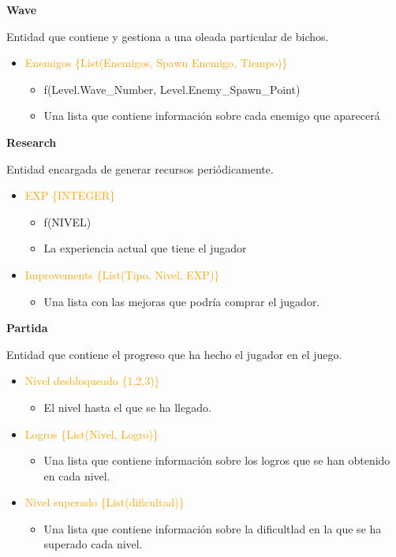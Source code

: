 \documentclass{article}
\begin{document}
\noindent \textbf{Wave}

\hfill \break \noindent Entidad que contiene y gestiona a una oleada particular de bichos.

\begin{itemize}
    \item \textcolor{Orange}{Enemigos \{List(Enemigos, Spawn Enemigo, Tiempo)\}}
    \begin{itemize}
        \item f(Level.Wave\_Number, Level.Enemy\_Spawn\_Point)
        \item Una lista que contiene información sobre cada enemigo que aparecerá
    \end{itemize}
\end{itemize}

\noindent \textbf{Research}

\hfill \break \noindent Entidad encargada de generar recursos periódicamente.

\begin{itemize}
    \item \textcolor{Orange}{EXP \{INTEGER\}}
    \begin{itemize}
        \item f(NIVEL)
        \item La experiencia actual que tiene el jugador
    \end{itemize}
    \item \textcolor{Orange}{Improvements \{List(Tipo, Nivel, EXP)\}}
    \begin{itemize}
        \item Una lista con las mejoras que podría comprar el jugador.
    \end{itemize}
\end{itemize}

\noindent \textbf{Partida}

\hfill \break \noindent Entidad que contiene el progreso que ha hecho el jugador en el juego.

\begin{itemize}
    \item \textcolor{Orange}{Nivel desbloqueado \{1,2,3)\}}
    \begin{itemize}
        \item El nivel hasta el que se ha llegado.
    \end{itemize}
    \item \textcolor{Orange}{Logros \{List(Nivel, Logro)\}}
    \begin{itemize}
        \item Una lista que contiene información sobre los logros que se han obtenido en cada nivel.
    \end{itemize}
    \item \textcolor{Orange}{Nivel superado \{List(dificultad)\}}
    \begin{itemize}
        \item Una lista que contiene información sobre la dificultlad en la que se ha superado cada nivel.
    \end{itemize}
\end{itemize}
\end{document}
